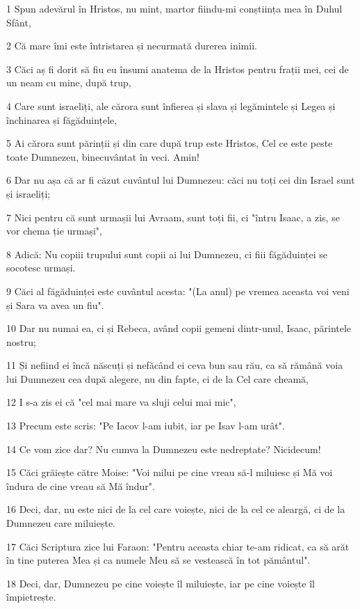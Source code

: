 \par 1 Spun adevărul în Hristos, nu mint, martor fiindu-mi conștiința mea în Duhul Sfânt,
\par 2 Că mare îmi este întristarea și necurmată durerea inimii.
\par 3 Căci aș fi dorit să fiu eu însumi anatema de la Hristos pentru frații mei, cei de un neam cu mine, după trup,
\par 4 Care sunt israeliți, ale cărora sunt înfierea și slava și legămintele și Legea și închinarea și făgăduințele,
\par 5 Ai cărora sunt părinții și din care după trup este Hristos, Cel ce este peste toate Dumnezeu, binecuvântat în veci. Amin!
\par 6 Dar nu așa că ar fi căzut cuvântul lui Dumnezeu: căci nu toți cei din Israel sunt și israeliți;
\par 7 Nici pentru că sunt urmașii lui Avraam, sunt toți fii, ci "întru Isaac, a zis, se vor chema ție urmași",
\par 8 Adică: Nu copiii trupului sunt copii ai lui Dumnezeu, ci fiii făgăduinței se socotesc urmași.
\par 9 Căci al făgăduinței este cuvântul acesta: "(La anul) pe vremea aceasta voi veni și Sara va avea un fiu".
\par 10 Dar nu numai ea, ci și Rebeca, având copii gemeni dintr-unul, Isaac, părintele nostru;
\par 11 Și nefiind ei încă născuți și nefăcând ei ceva bun sau rău, ca să rămână voia lui Dumnezeu cea după alegere, nu din fapte, ci de la Cel care cheamă,
\par 12 I s-a zis ei că "cel mai mare va sluji celui mai mic",
\par 13 Precum este scris: "Pe Iacov l-am iubit, iar pe Isav l-am urât".
\par 14 Ce vom zice dar? Nu cumva la Dumnezeu este nedreptate? Nicidecum!
\par 15 Căci grăiește către Moise: "Voi milui pe cine vreau să-l miluiesc și Mă voi îndura de cine vreau să Mă îndur".
\par 16 Deci, dar, nu este nici de la cel care voiește, nici de la cel ce aleargă, ci de la Dumnezeu care miluiește.
\par 17 Căci Scriptura zice lui Faraon: "Pentru aceasta chiar te-am ridicat, ca să arăt în tine puterea Mea și ca numele Meu să se vestească în tot pământul".
\par 18 Deci, dar, Dumnezeu pe cine voiește îl miluiește, iar pe cine voiește îl împietrește.
